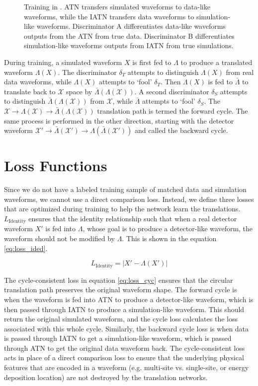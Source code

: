 \begin{figure}[htb!]
    \caption{Training in {\cpunet}. ATN transfers simulated waveforms to data-like waveforms, while the IATN transfers data waveforms to simulation-like waveforms. Discriminator A differentiates data-like waveforms outputs from the ATN from true data. Discriminator B differentiates simulation-like waveforms outputs from IATN from true simulations.}
   \label{fig:network_training}
\end{figure}

During training, a simulated waveform $X$ is first fed to $\Lambda$ to produce a translated waveform $\Lambda(X)$. The discriminator $\delta_{T}$ attempts to distinguish $\Lambda(X)$ from real data waveforms, while $\Lambda(X)$ attempts to `fool' $\delta_{T}$. Then $\Lambda(X)$ is fed to $\bar{\Lambda}$ to translate back to $\mathcal{X}$ space by $\bar{\Lambda}(\Lambda(\mathcal{X}))$. A second discriminator $\delta_{S}$ attempts to distinguish $\bar{\Lambda}(\Lambda(\mathcal{X}))$ from $\mathcal{X}$, while $\bar{\Lambda}$ attempts to `fool' $\delta_{S}$. The $\mathcal{X}\rightarrow{}\Lambda(\mathcal{X})\rightarrow{}\bar{\Lambda}(\Lambda(\mathcal{X}))$ translation path is termed the forward cycle. The same process is performed in the other direction, starting with the detector waveform $\mathcal{X}'\rightarrow{}\bar{\Lambda}(\mathcal{X}')\rightarrow{}\Lambda(\bar{\Lambda}(\mathcal{X}'))$ and called the backward cycle.

\section{Loss Functions}
Since we do not have a labeled training sample of matched data and simulation waveforms, we cannot use a direct comparison loss. Instead, we define three losses that are optimized during training to help the network learn the translations. $L_{\mathrm{Identity}}$ ensures that the identity relationship such that when a real detector waveform $X'$ is fed into $\Lambda$, whose goal is to produce a detector-like waveform, the waveform should not be modified by $\Lambda$. This is shown in the equation \ref{eq:loss_ided}. 

\begin{equation}\label{eq:loss_ided}
    L_{\mathrm{Identity}} = |X' - \Lambda(X')|
\end{equation}

The cycle-consistent loss in equation \ref{eq:loss_cyc} ensures that the circular translation path preserves the original waveform shape. The forward cycle is when the waveform is fed into ATN to produce a detector-like waveform, which is then passed through IATN to produce a simulation-like waveform. This should return the original simulated waveform, and the cycle loss calculates the loss associated with this whole cycle. Similarly, the backward cycle loss is when data is passed through IATN to get a simulation-like waveform, which is passed through ATN to get the original data waveform back. The cycle-consistent loss acts in place of a direct comparison loss to ensure that the underlying physical features that are encoded in a waveform (e.g. multi-site vs. single-site, or energy deposition location) are not destroyed by the translation networks.

